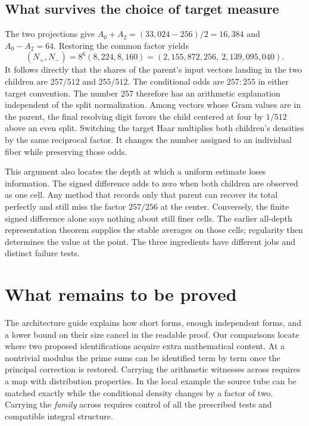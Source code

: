 \documentclass[12pt,letterpaper]{article}
\begin{document}
\subsection{What survives the choice of target measure}
The two projections give $A_0+A_2=(33{,}024-256)/2=16{,}384$ and $A_0-A_2=64$. Restoring the common factor yields
\[
 (N_+,N_-)=8^6(8{,}224,8{,}160)
           =(2{,}155{,}872{,}256,\ 2{,}139{,}095{,}040).
\]
It follows directly that the shares of the parent's input vectors landing in the two children are $257/512$ and $255/512$. The conditional odds are $257:255$ in either target convention. The number 257 therefore has an arithmetic explanation independent of the split normalization. Among vectors whose Gram values are in the parent, the final resolving digit favors the child centered at four by $1/512$ above an even split. Switching the target Haar multiplies both children's densities by the same reciprocal factor. It changes the number assigned to an individual fiber while preserving those odds.

This argument also locates the depth at which a uniform estimate loses information. The signed difference adds to zero when both children are observed as one cell. Any method that records only that parent can recover its total perfectly and still miss the factor $257/256$ at the center. Conversely, the finite signed difference alone says nothing about still finer cells. The earlier all-depth representation theorem supplies the stable averages on those cells; regularity then determines the value at the point. The three ingredients have different jobs and distinct failure tests.



\section{What remains to be proved}\label{sec:decisions}
The architecture guide explains how short forms, enough independent forms, and a lower bound on their size cancel in the readable proof. Our comparisons locate where two proposed identifications acquire extra mathematical content. At a nontrivial modulus the prime sums can be identified term by term once the principal correction is restored. Carrying the arithmetic witnesses across requires a map with distribution properties. In the local example the source tube can be matched exactly while the conditional density changes by a factor of two. Carrying the \emph{family} across requires control of all the prescribed tests and compatible integral structure.
\end{document}
